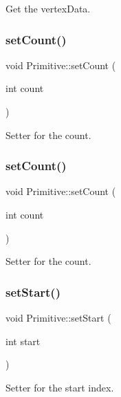 Get the vertex\+Data. \mbox{\label{classPrimitive_acf3d34a3828a3f4cb97779ac852121a6}} 
\subsubsection{\texorpdfstring{set\+Count()}{setCount()}\hspace{0.1cm}{\footnotesize\ttfamily [1/2]}}
{\footnotesize\ttfamily void Primitive\+::set\+Count (\begin{DoxyParamCaption}\item[{int}]{count }\end{DoxyParamCaption})}

Setter for the count. \mbox{\label{classPrimitive_acf3d34a3828a3f4cb97779ac852121a6}} 
\subsubsection{\texorpdfstring{set\+Count()}{setCount()}\hspace{0.1cm}{\footnotesize\ttfamily [2/2]}}
{\footnotesize\ttfamily void Primitive\+::set\+Count (\begin{DoxyParamCaption}\item[{int}]{count }\end{DoxyParamCaption})}

Setter for the count. \mbox{\label{classPrimitive_a0d86c220ce189f2e70e40bf75a29b964}} 
\subsubsection{\texorpdfstring{set\+Start()}{setStart()}\hspace{0.1cm}{\footnotesize\ttfamily [1/2]}}
{\footnotesize\ttfamily void Primitive\+::set\+Start (\begin{DoxyParamCaption}\item[{int}]{start }\end{DoxyParamCaption})}

Setter for the start index. \mbox{\label{classPrimitive_a0d86c220ce189f2e70e40bf75a29b964}} 
